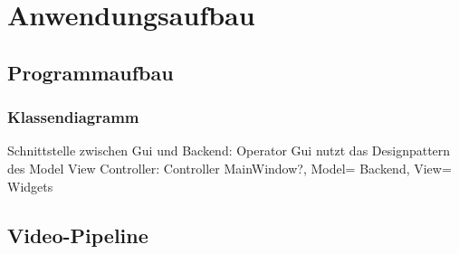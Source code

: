 \chapter{Anwendungsaufbau}
\label{ch:anwendungsaufbau}

\section{Programmaufbau}

\subsection*{Klassendiagramm}

Schnittstelle zwischen Gui und Backend: Operator
Gui nutzt das Designpattern des Model View Controller: Controller MainWindow?, Model= Backend, View= Widgets


\section{Video-Pipeline}

